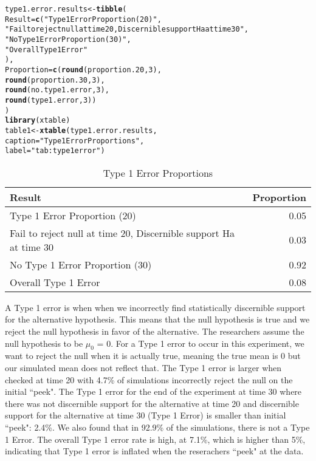 \documentclass{article}\usepackage[]{graphicx}\usepackage[]{xcolor}
\makeatletter
\newcommand{\hlnum}[1]{\textcolor[rgb]{0.686,0.059,0.569}{#1}}%
\newcommand{\hlsng}[1]{\textcolor[rgb]{0.192,0.494,0.8}{#1}}%
\newcommand{\hldef}[1]{\textcolor[rgb]{0.345,0.345,0.345}{#1}}%
\newcommand{\hlkwb}[1]{\textcolor[rgb]{0.69,0.353,0.396}{#1}}%
\newcommand{\hlkwc}[1]{\textcolor[rgb]{0.333,0.667,0.333}{#1}}%
\newcommand{\hlkwd}[1]{\textcolor[rgb]{0.737,0.353,0.396}{\textbf{#1}}}%
\newenvironment{kframe}{%
 \def\at@end@of@kframe{}%
 \ifinner\ifhmode%
  \def\at@end@of@kframe{\end{minipage}}%
  \begin{minipage}{\columnwidth}%
 \fi\fi%
 \def\FrameCommand##1{\hskip\@totalleftmargin \hskip-\fboxsep
 \colorbox{shadecolor}{##1}\hskip-\fboxsep
     \hskip-\linewidth \hskip-\@totalleftmargin \hskip\columnwidth}%
 \MakeFramed {\advance\hsize-\width
   \@totalleftmargin\z@ \linewidth\hsize
   \@setminipage}}%
 {\par\unskip\endMakeFramed%
 \at@end@of@kframe}
\newenvironment{knitrout}{}{} %
\makeatother
\begin{document}
\begin{enumerate}
\begin{enumerate}
\begin{knitrout}
\begin{kframe}
\begin{alltt}
\hldef{type1.error.results} \hlkwb{<-} \hlkwd{tibble}\hldef{(}
  \hlkwc{Result} \hldef{=} \hlkwd{c}\hldef{(}\hlsng{"Type 1 Error Proportion (20)"}\hldef{,}
             \hlsng{"Fail to reject null at time 20, Discernible support Ha at time 30"}\hldef{,}
             \hlsng{"No Type 1 Error Proportion (30)"}\hldef{,}
             \hlsng{"Overall Type 1 Error"}
             \hldef{),}
  \hlkwc{Proportion} \hldef{=} \hlkwd{c}\hldef{(}\hlkwd{round}\hldef{(proportion.20,}\hlnum{3}\hldef{),}
                 \hlkwd{round}\hldef{(proportion.30,}\hlnum{3}\hldef{),}
                 \hlkwd{round}\hldef{(no.type1.error,}\hlnum{3}\hldef{),}
                 \hlkwd{round}\hldef{(type1.error,}\hlnum{3}\hldef{))}
\hldef{)}
\hlkwd{library}\hldef{(xtable)}
\hldef{table1} \hlkwb{<-} \hlkwd{xtable}\hldef{(type1.error.results,}
                 \hlkwc{caption} \hldef{=} \hlsng{"Type 1 Error Proportions"}\hldef{,}
                 \hlkwc{label} \hldef{=} \hlsng{"tab:type1error"}\hldef{)}
\end{alltt}
\end{kframe}
\end{knitrout}
\begin{table}[H]
\centering
\begingroup\small
\begin{tabular}{lr}
  \hline
Result & Proportion \\ 
  \hline
Type 1 Error Proportion (20) & 0.05 \\ 
  Fail to reject null at time 20, Discernible support Ha at time 30 & 0.03 \\ 
  No Type 1 Error Proportion (30) & 0.92 \\ 
  Overall Type 1 Error & 0.08 \\ 
   \hline
\end{tabular}
\endgroup
\caption{Type 1 Error Proportions} 
\label{tab:type1error}
\end{table}

A Type 1 error is when when we incorrectly find statistically discernible support for the alternative hypothesis. This means that the null hypothesis is true and we reject the null hypothesis in favor of the alternative. The researchers assume the null hypothesis to be $\mu_{0}$ = 0. For a Type 1 error to occur in this experiment, we want to reject the null when it is actually true, meaning the true mean is 0 but our simulated mean does not reflect that. The Type 1 error is larger when checked at time 20 with 4.7\% of simulations incorrectly reject the null on the initial ``peek". The Type 1 error for the end of the experiment at time 30 where there was not discernible support for the alternative at time 20 and discernible support for the alternative at time 30 (Type 1 Error) is smaller than initial ``peek": 2.4\%.
We also found that in 92.9\% of the simulations, there is not a Type 1 Error. The overall Type 1 error rate is high, at 7.1\%, which is higher than 5\%, indicating that Type 1 error is inflated when the reserachers ``peek" at the data.


\end{enumerate}
\end{enumerate}
\end{document}
